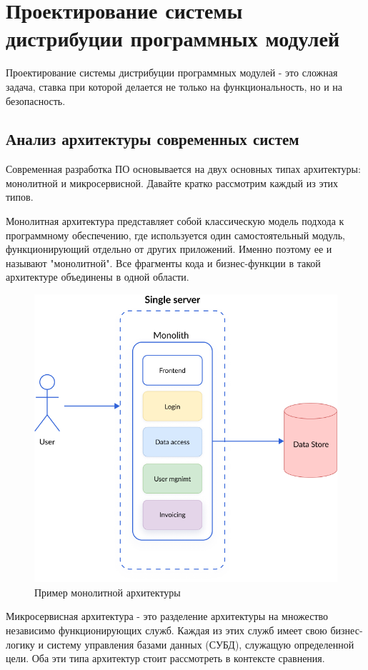 \chapter{Проектирование системы дистрибуции программных модулей}
\label{cha:design}

Проектирование системы дистрибуции программных модулей - это сложная задача, ставка при которой делается не только на функциональность, но и на безопасность. 

\section{Анализ архитектуры современных систем}

Современная разработка ПО основывается на двух основных типах архитектуры: монолитной и микросервисной. Давайте кратко рассмотрим каждый из этих типов. 

Монолитная архитектура представляет собой классическую модель подхода к программному обеспечению, где используется один самостоятельный модуль, функционирующий отдельно от других приложений. Именно поэтому ее и называют "монолитной". Все фрагменты кода и бизнес-функции в такой архитектуре объединены в одной области.

\begin{figure}
  \centering
  \includegraphics[width=.7\textwidth]{graphics/img/mono.png}
  \caption{Пример монолитной архитектуры}
  \label{fig:mono}
\end{figure}


Микросервисная архитектура - это разделение архитектуры на множество независимо функционирующих служб. Каждая из этих служб имеет свою бизнес-логику и систему управления базами данных (СУБД), служащую определенной цели. Оба эти типа архитектур стоит рассмотреть в контексте сравнения.

